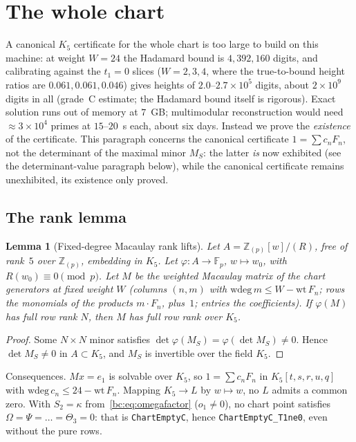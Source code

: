 \documentclass[a4paper,11pt]{article}
\theoremstyle{plain}
\newtheorem{lemma}[theorem]{Lemma}
\theoremstyle{definition}
\theoremstyle{remark}
\begin{document}
\section{The whole chart}\label{bc:sec:wholechart}

A canonical $K_5$ certificate for the whole chart is too large to build on this machine: at weight $W=24$ the Hadamard bound is $4{,}392{,}160$ digits, and calibrating against the $t_1=0$ slices ($W=2,3,4$, where the true-to-bound height ratios are $0.061,0.061,0.046$) gives heights of $2.0$--$2.7\times10^5$ digits, about $2\times10^9$ digits in all (grade~C estimate; the Hadamard bound itself is rigorous). Exact solution runs out of memory at $7$~GB; multimodular reconstruction would need $\approx3\times10^4$ primes at $15$--$20$~s each, about six days. Instead we prove the \emph{existence} of the certificate. This paragraph concerns the canonical certificate $1=\sum c_nF_n$, not the determinant of the maximal minor $M_S$: the latter \emph{is} now exhibited (see the determinant-value paragraph below), while the canonical certificate remains unexhibited, its existence only proved.

\subsection{The rank lemma}

\begin{lemma}[Fixed-degree Macaulay rank lifts]\label{bc:lem:rank}
Let $A=\mathbb{Z}_{(p)}[w]/(R)$, free of rank~$5$ over $\mathbb{Z}_{(p)}$, embedding in $K_5$. Let $\varphi:A\to\mathbb{F}_p$, $w\mapsto w_0$, with $R(w_0)\equiv0\pmod p$. Let $M$ be the weighted Macaulay matrix of the chart generators at fixed weight $W$ (columns $(n,m)$ with $\mathrm{wdeg}\,m\le W-\mathrm{wt}\,F_n$; rows the monomials of the products $m\cdot F_n$, plus~$1$; entries the coefficients). If $\varphi(M)$ has full row rank $N$, then $M$ has full row rank over $K_5$.
\end{lemma}
\begin{proof}
Some $N\times N$ minor satisfies $\det\varphi(M_S)=\varphi(\det M_S)\ne0$. Hence $\det M_S\ne0$ in $A\subset K_5$, and $M_S$ is invertible over the field $K_5$.
\end{proof}

Consequences. $Mx=e_1$ is solvable over $K_5$, so $1=\sum c_nF_n$ in $K_5[t,s,r,u,q]$ with $\mathrm{wdeg}\,c_n\le24-\mathrm{wt}\,F_n$. Mapping $K_5\to L$ by $w\mapsto w$, no $L$ admits a common zero. With $S_2=\kappa$ from~\eqref{bc:eq:omegafactor} ($o_1\ne0$), no chart point satisfies $\Omega=\Psi=\dots=\Theta_3=0$: that is \texttt{ChartEmptyC}, hence \texttt{ChartEmptyC\_T1ne0}, even without the pure rows.
\end{document}

